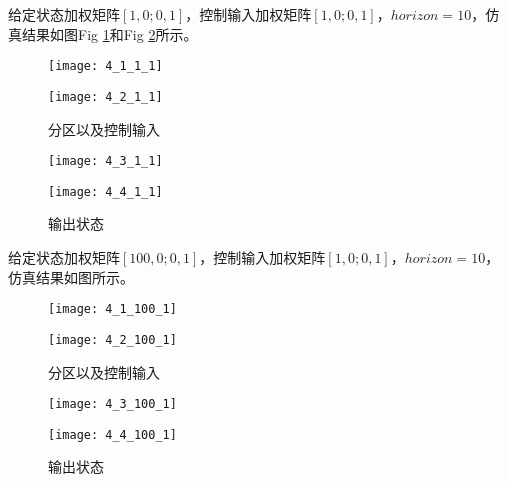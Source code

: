 \documentclass[UTF8]{article}
\begin{document}
给定状态加权矩阵$[1,0;0,1]$，控制输入加权矩阵$[1,0;0,1]$，$horizon = 10$，仿真结果如图Fig \ref{fig:1_7}和Fig \ref{fig:1_8}所示。
\begin{figure}[htbp]
    \setlength{\belowcaptionskip}{-0.45cm}
    
        \begin{minipage}{0.49\textwidth}
        \centering
    
        \texttt{[image: 4\_1\_1\_1]}    
        \end{minipage}
        \begin{minipage}{0.49\textwidth}
        \centering
        \texttt{[image: 4\_2\_1\_1]}    
        \end{minipage}
    \caption{分区以及控制输入}
    \label{fig:1_7}
\end{figure}
\begin{figure}[htbp]
    \setlength{\belowcaptionskip}{-0.45cm}
    
        \begin{minipage}{0.49\textwidth}
        \centering
    
        \texttt{[image: 4\_3\_1\_1]}    
        \end{minipage}
        \begin{minipage}{0.49\textwidth}
        \centering
        \texttt{[image: 4\_4\_1\_1]}    
        \end{minipage}
    \caption{输出状态}
    \label{fig:1_8}
\end{figure}

给定状态加权矩阵$[100,0;0,1]$，控制输入加权矩阵$[1,0;0,1]$，$horizon = 10$，仿真结果如图所示。
\begin{figure}[htbp]
    \setlength{\belowcaptionskip}{-0.45cm}
    
        \begin{minipage}{0.49\textwidth}
        \centering
    
        \texttt{[image: 4\_1\_100\_1]}    
        \end{minipage}
        \begin{minipage}{0.49\textwidth}
        \centering
        \texttt{[image: 4\_2\_100\_1]}    
        \end{minipage}
    \caption{分区以及控制输入}
    \label{fig:1_9}
\end{figure}
\begin{figure}[htbp]
    \setlength{\belowcaptionskip}{-0.45cm}
    
        \begin{minipage}{0.49\textwidth}
        \centering
    
        \texttt{[image: 4\_3\_100\_1]}    
        \end{minipage}
        \begin{minipage}{0.49\textwidth}
        \centering
        \texttt{[image: 4\_4\_100\_1]}    
        \end{minipage}
    \caption{输出状态}
    \label{fig:1_10}
\end{figure}
\end{document}
